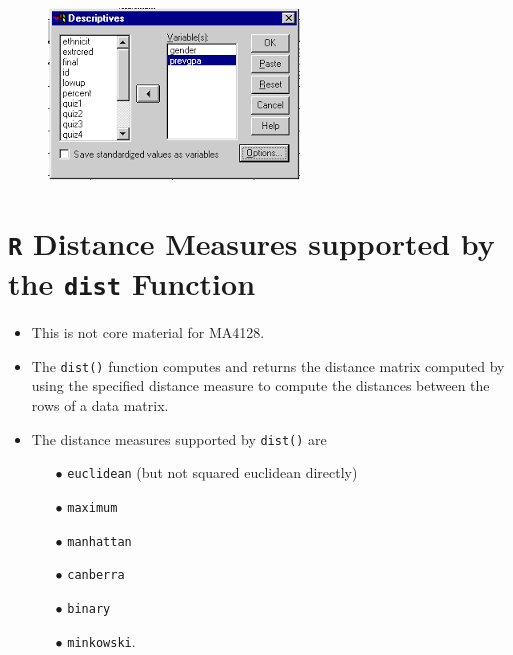 \documentclass[a4paper,12pt]{report}
\begin{document}
\begin{figure}[h!]
\centering
\includegraphics[width=0.5\linewidth]{spss-zscore}

\end{figure}


\section{\texttt{R} Distance Measures supported by the \texttt{dist} Function}
\begin{itemize}
	\item This is not core material for MA4128.
	\item The \texttt{dist()} function computes and returns the distance matrix computed by using the specified distance measure to compute the distances between the rows of a data matrix.
	\item 
	The distance measures supported by \texttt{dist()} are
	
	\begin{itemize}
		\item[$\bullet$] \texttt{euclidean} (but not squared euclidean directly)
		\item[$\bullet$] \texttt{maximum}
		\item[$\bullet$] \texttt{manhattan}
		\item[$\bullet$] \texttt{canberra}
		\item[$\bullet$] \texttt{binary} 
		\item[$\bullet$] \texttt{minkowski}.
	\end{itemize}
\end{itemize}
\end{document}
